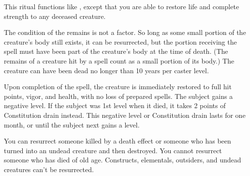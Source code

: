 \begin{spelleffect}
This ritual functions like , except that you are able to restore life and complete strength to any deceased creature.
\par The condition of the remains is not a factor. So long as some small portion of the creature's body still exists, it can be resurrected, but the portion receiving the spell must have been part of the creature's body at the time of death. (The remains of a creature hit by a  spell count as a small portion of its body.) The creature can have been dead no longer than 10 years per caster level.
\par Upon completion of the spell, the creature is immediately restored to full hit points, vigor, and health, with no loss of prepared spells. The subject gains a negative level. If the subject was 1st level when it died, it takes 2 points of Constitution drain instead. This negative level or Constitution drain lasts for one month, or until the subject next gains a level.
\end{spelleffect}
\begin{spellnotes}
You can resurrect someone killed by a death effect or someone who has been turned into an undead creature and then destroyed. You cannot resurrect someone who has died of old age. Constructs, elementals, outsiders, and undead creatures can't be resurrected.
\end{spellnotes}

